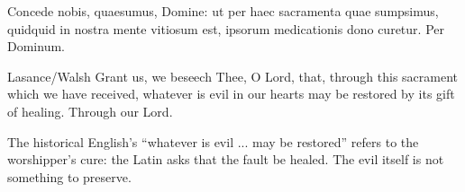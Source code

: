 \begin{latinproper}
Concede nobis, quaesumus, Domine: ut per haec sacramenta quae sumpsimus,
quidquid in nostra mente vitiosum est, ipsorum medicationis dono curetur.
Per Dominum.
\end{latinproper}

\begin{englishwitness}{Lasance/Walsh}
Grant us, we beseech Thee, O Lord, that, through this sacrament which we
have received, whatever is evil in our hearts may be restored by its
gift of healing. Through our Lord.
\end{englishwitness}

The historical English's ``whatever is evil ... may be restored''
refers to the worshipper's cure: the Latin asks that the fault be healed.
The evil itself is not something to preserve.
